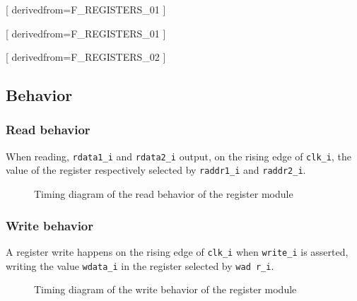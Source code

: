 [
  derivedfrom=F\_REGISTERS\_01
]

[
  derivedfrom=F\_REGISTERS\_01
]

[
  derivedfrom=F\_REGISTERS\_02
]

\subsection{Behavior}

\subsubsection{Read behavior}

\begin{content}
  When reading, \texttt{rdata1\_i} and \texttt{rdata2\_i} output, on the rising edge of \texttt{clk\_i}, the value of the register respectively selected by \texttt{raddr1\_i}
and \texttt{raddr2\_i}.
\end{content}

\begin{figure}[H]
    \centering
    
    \caption{Timing diagram of the read behavior of the register module}
    \label{fig:regm-behavior-read}
\end{figure}

\subsubsection{Write behavior}

\begin{content}
A register write happens on the rising edge of \texttt{clk\_i} when \texttt{write\_i} is asserted, writing the value \texttt{wdata\_i} in the register selected by \texttt{wad
r\_i}.
\end{content}

\begin{figure}[H]
    \centering
    
    \caption{Timing diagram of the write behavior of the register module}
    \label{fig:regm-behavior-write}
\end{figure}

